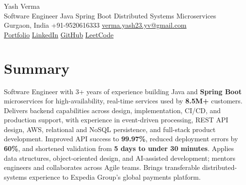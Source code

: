 \documentclass[letterpaper,11pt]{article}
\begin{document}
\begin{center}
  {\Huge Yash Verma} \\
  \small Software Engineer \textperiodcentered{} Java \textperiodcentered{} Spring Boot \textperiodcentered{} Distributed Systems \textperiodcentered{} Microservices \\
  \vspace{5pt}
  \small Gurgaon, India \textbar{} +91-9520616333 \textbar{}
  \href{mailto:verma.yash23.yv@gmail.com}{verma.yash23.yv@gmail.com} \\
  \vspace{7pt}
  \href{https://yashverma230600.github.io/yash-portfolio/}{Portfolio} \textbar{}
  \href{https://www.linkedin.com/in/yash-verma-9243a7193/}{LinkedIn} \textbar{}
  \href{https://github.com/yashverma230600}{GitHub} \textbar{}
  \href{https://leetcode.com/yashverma230600}{LeetCode}
  \vspace{-8pt}
\end{center}

\section{Summary}
\begin{itemize}[leftmargin=0.15in, label={}]
  \small{\item{
    Software Engineer with 3+ years of experience building Java and \textbf{Spring Boot} microservices for high-availability, real-time services used by \textbf{8.5M+} customers. Delivers backend capabilities across design, implementation, CI/CD, and production support, with experience in event-driven processing, REST API design, AWS, relational and NoSQL persistence, and full-stack product development. Improved API success to \textbf{99.97\%}, reduced deployment errors by \textbf{60\%}, and shortened validation from \textbf{5 days to under 30 minutes}. Applies data structures, object-oriented design, and AI-assisted development; mentors engineers and collaborates across Agile teams. Brings transferable distributed-systems experience to Expedia Group's global payments platform.
  }}
\end{itemize}
\vspace{-8pt}

\end{document}
